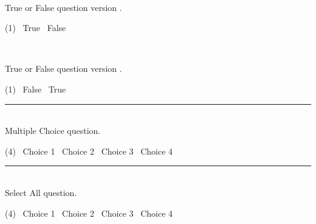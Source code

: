 \begin{question}[class=A]{2}
  \label{question:true-false-a}
  \TrueFalseInstructions \\
  \begin{minipage}{0.85\textwidth}
    True or False question version \GetVersionID.
  \end{minipage}%
  \begin{minipage}{0.15\textwidth}
    \begin{tasks}(1)
      \task[\choice] \ True
      \task[\correctchoice] \ False
    \end{tasks}
  \end{minipage}
\end{question}

\begin{question}[class=B]{2}
  \label{question:true-false-b}
  \TrueFalseInstructions \\
  \begin{minipage}{0.85\textwidth}
    True or False question version \GetVersionID.
  \end{minipage}%
  \begin{minipage}{0.15\textwidth}
    \begin{tasks}(1)
      \task[\correctchoice] \ False
      \task[\choice] \ True
    \end{tasks}
  \end{minipage}
\end{question}

\noindent\rule{\textwidth}{1pt}

\begin{question}[class=Z]{3}
  \label{question:multiple-choice}
  \MultipleChoiceInstructions \\
  Multiple Choice question.
  \begin{tasks}(4)
    \task[\choice] \ Choice 1
    \task[\correctchoice] \ Choice 2
    \task[\choice] \ Choice 3
    \task[\choice] \ Choice 4
  \end{tasks}
\end{question}

\noindent\rule{\textwidth}{1pt}

\begin{question}[class=Z]{3}
  \label{question:select-all}
  \SelectAllInstructions \\
  Select All question.
  \begin{tasks}(4)
    \task[\selectall] \ Choice 1
    \task[\correctselectall] \ Choice 2
    \task[\selectall] \ Choice 3
    \task[\selectall] \ Choice 4
  \end{tasks}
\end{question}

